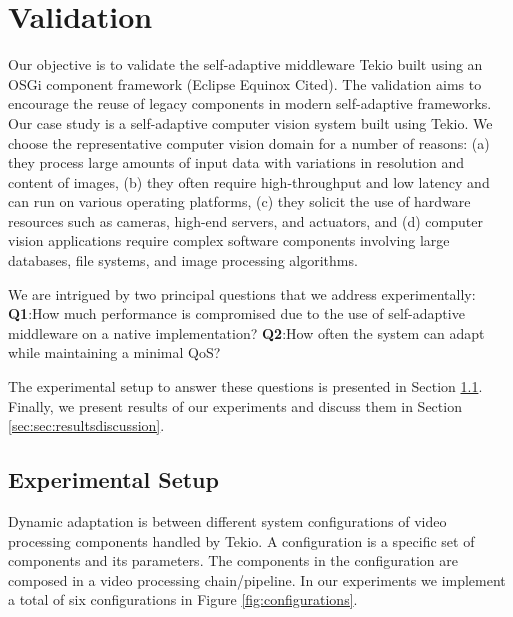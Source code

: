 \section{Validation}
\label{sec:validation}

Our objective is to validate the self-adaptive middleware Tekio built using an OSGi component framework (Eclipse Equinox Cited). The validation aims to encourage the reuse of legacy components in modern self-adaptive frameworks. Our case study is a self-adaptive computer vision system built using Tekio. We choose the representative computer vision domain for a number of reasons: (a) they process large amounts of input data with variations in resolution and content of images, (b) they often require high-throughput and low latency and can run on various operating platforms, (c) they solicit the use of hardware resources such as cameras, high-end  servers, and actuators, and (d) computer vision applications require complex software components involving large databases, file systems, and image processing algorithms.

We are intrigued by two principal questions that we address experimentally:
\noindent \textbf{Q1}:How much performance is compromised due to the use of self-adaptive middleware on a native implementation?
\noindent \textbf{Q2}:How often the system can adapt while maintaining a minimal QoS?

The experimental setup to answer these questions is presented in Section \ref{sec:sec:experimentalsetup}. Finally, we present results of our experiments and discuss them in Section \ref{sec:sec:resultsdiscussion}.


\subsection{Experimental Setup}
\label{sec:sec:experimentalsetup}

Dynamic adaptation is between different system configurations of video processing components handled by Tekio. A configuration is a specific set of components and its parameters. The components in the configuration are composed in a video processing chain/pipeline. In our experiments we implement a total of six configurations in Figure \ref{fig:configurations}.

